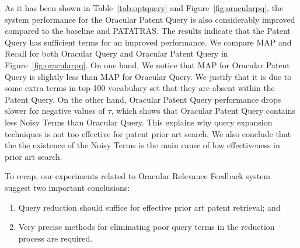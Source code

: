 As it has been shown in Table~\ref{tab:optquery} and Figure~\ref{fig:oracularpq}, the system performance for the Oracular Patent Query is also considerably improved compared to the baseline and PATATRAS.
The results indicate that the Patent Query has sufficient terms for an improved performance. 
We compare MAP and Recall for both Oracular Query and Oracular Patent Query in Figure~\ref{fig:oracularpq}. 
On one hand, We notice that MAP for Oracular Patent Query is slightly less than MAP for Oracular Query. We justify that it is due to some extra terms in top-100 vocabulary set that they are absent within the Patent Query. On the other hand, Oracular Patent Query performance drops slower for negative values of $\tau$, which shows that Oracular Patent Query contains less Noisy Terms than Oracular Query. 
This explains why query expansion techniques is not too effective for patent prior art search. We also conclude that the the existence of the Noisy Terms is the main cause of low effectiveness in prior art search.  

To recap, our experiments related to Oracular Relevance Feedback system
suggest two important conclusions: 
\begin{enumerate}
\item Query reduction should suffice for effective prior art patent retrieval; and 
\item Very precise methods for eliminating poor query terms in the reduction process are required.
\end{enumerate}

%

